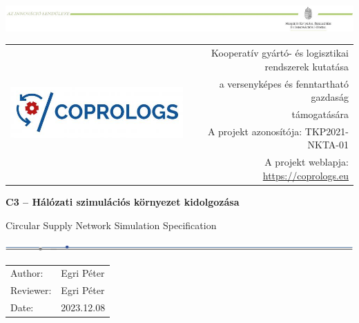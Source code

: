 \documentclass{article}
\begin{document}
\begin{titlepage}
	\thispagestyle{titlep}
	   \includegraphics[width=\textwidth]{header-crop.pdf}
       \vspace*{1cm}
       
       \begin{tabular}{lr}
    	   \multirow{5}{0.35\textwidth}{\includegraphics{logo.png}} & {\small Kooperatív gyártó- és logisztikai rendszerek kutatása} \\
			& {\small a versenyképes és fenntartható gazdaság} \\
			& {\small támogatására} \\[2mm]
			& {\scriptsize A projekt azonosítója: TKP2021-NKTA-01} \\
			& {\scriptsize A projekt weblapja: \href{https://coprologs.eu}{https://coprologs.eu}} \\
       \end{tabular}
        \vspace*{3cm}

		\noindent
       \textbf{{\LARGE C3 -- Hálózati szimulációs környezet kidolgozása}}

       \vspace{0.5cm}
       \noindent
        {\Large Circular Supply Network Simulation Specification}
            
       \vspace{1cm}
       
       \noindent
       \includegraphics[width=\textwidth]{line.png}
       
       \vspace*{1cm}
       \noindent
       \begin{tabular}{ll}
       		Author: & Egri Péter \\
       		Reviewer: & Egri Péter \\
       		Date: & 2023.12.08 \\       
       \end{tabular}



\end{titlepage}
\end{document}
